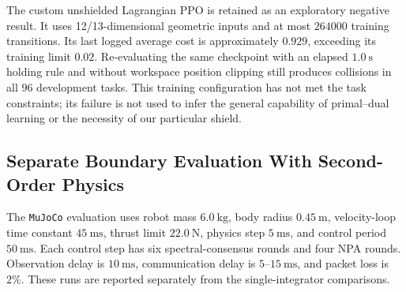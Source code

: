 The custom unshielded Lagrangian PPO is retained as an exploratory negative result. It uses 12/13-dimensional geometric inputs and at most $264000$ training transitions. Its last logged average cost is approximately $0.929$, exceeding its training limit $0.02$. Re-evaluating the same checkpoint with an elapsed $1.0\ \mathrm s$ holding rule and without workspace position clipping still produces collisions in all $96$ development tasks. This training configuration has not met the task constraints; its failure is not used to infer the general capability of primal--dual learning or the necessity of our particular shield.

\subsection{Separate Boundary Evaluation With Second-Order Physics}\label{subsec:mujoco}
The \texttt{MuJoCo} evaluation uses robot mass $6.0\ \mathrm{kg}$, body radius $0.45\ \mathrm m$, velocity-loop time constant $45\ \mathrm{ms}$, thrust limit $22.0\ \mathrm N$, physics step $5\ \mathrm{ms}$, and control period $50\ \mathrm{ms}$. Each control step has six spectral-consensus rounds and four NPA rounds. Observation delay is $10\ \mathrm{ms}$, communication delay is $5$--$15\ \mathrm{ms}$, and packet loss is $2\%$. These runs are reported separately from the single-integrator comparisons.

